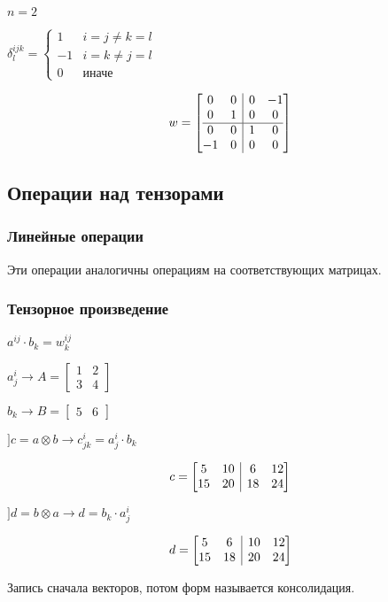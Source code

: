 \begin{example}
    $n=2$

    $\delta^{ijk}_l=\begin{cases}
        1 & i=j\not=k=l \\
        -1 & i=k\not=j=l \\
        0 & \text{иначе}
    \end{cases}$

    \[w=
    \left[
    \begin{array}{@{}cc|cc@{}}
        0&0&0&-1\\
        0&1&0&0\\
        \hline
        0&0&1&0\\
        -1&0&0&0\\
    \end{array}
    \right]
    \]
\end{example}

\subsection{Операции над тензорами}

\subsubsection{Линейные операции}

Эти операции аналогичны операциям на соответствующих матрицах.

\subsubsection{Тензорное произведение}

\(a^{ij}\cdot b_k=w^{ij}_k\)

\begin{example}
    $a^i_j\to A=\begin{bmatrix}
        1 & 2 \\
        3 & 4
    \end{bmatrix}$

    $b_k\to B=\begin{bmatrix}
        5 & 6
    \end{bmatrix}$

    $] c=a\otimes b \to c^i_{jk}=a^i_j\cdot b_k$

    \[c=
    \left[
    \begin{array}{@{}cc|cc@{}}
        5 & 10 & 6 & 12 \\
        15 & 20 & 18 & 24
    \end{array}
    \right]
    \]

    $] d=b\otimes a \to d=b_k\cdot a^i_j$

    \[d=
    \left[
    \begin{array}{@{}cc|cc@{}}
        5 & 6 & 10 & 12 \\
        15 & 18 & 20 & 24
    \end{array}
    \right]
    \]

    Запись сначала векторов, потом форм называется консолидация.
\end{example}

